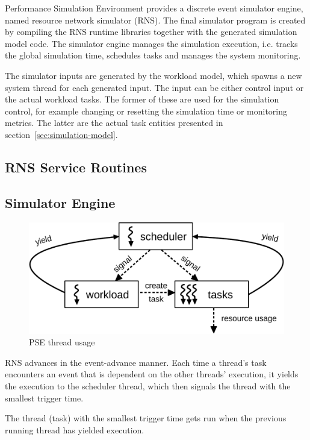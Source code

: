 Performance Simulation Environment provides a discrete event simulator engine, named resource network simulator (RNS). The final simulator program is created by compiling the RNS runtime libraries together with the generated simulation model code. The simulator engine manages the simulation execution, i.e. tracks the global simulation time, schedules tasks and manages the system monitoring.

The simulator inputs are generated by the workload model, which spawns a new system thread for each generated input. The input can be either control input or the actual workload tasks. The former of these are used for the simulation control, for example changing or resetting the simulation time or monitoring metrics. The latter are the actual task entities presented in section~\ref{sec:simulation-model}.


\subsection{RNS Service Routines}
\label{sec:rns-service-routines}


\subsection{Simulator Engine}
\label{sec:simulator-engine}

\begin{figure}[]
  \begin{center}
    \includegraphics[width=\textwidth]{images/rns-threads.pdf}
    \caption{PSE thread usage}
    \label{fig:rns-threads}
  \end{center}
\end{figure}

RNS advances in the event-advance manner. Each time a thread's task encounters an event that is dependent on the other threads' execution, it yields the execution to the scheduler thread, which then signals the thread with the smallest trigger time.

The thread (task) with the smallest trigger time gets run when the previous running thread has yielded execution.


